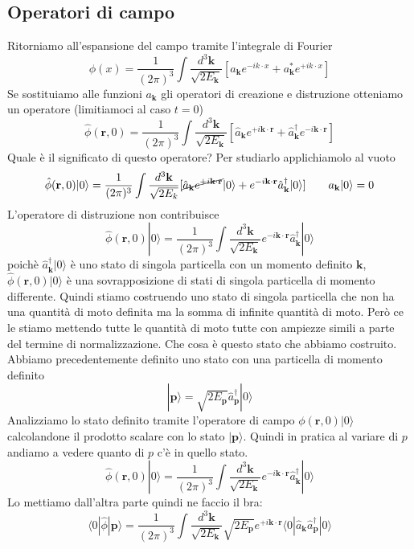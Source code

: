 \subsection{Operatori di campo}
Ritorniamo all'espansione del campo tramite l'integrale di Fourier
$$
\phi(x) = \frac{1}{(2\pi)^3} \int \frac{d^3\mathbf{k}}{\sqrt{2E_\mathbf{k}}} [a_\mathbf{k} e^{-ik\cdot x} + a_\mathbf{k}^* e^{+ik\cdot x}]
$$
Se sostituiamo alle funzioni $a_\mathbf{k}$ gli operatori di creazione e distruzione otteniamo un operatore (limitiamoci al caso $t=0$)
$$
\hat{\phi}(\mathbf{r}, 0) = \frac{1}{(2\pi)^3} \int \frac{d^3\mathbf{k}}{\sqrt{2E_\mathbf{k}}} [\hat{a}_\mathbf{k} e^{+i\mathbf{k}\cdot\mathbf{r}} + \hat{a}_\mathbf{k}^\dagger e^{-i\mathbf{k}\cdot\mathbf{r}}]
$$
Quale è il significato di questo operatore? Per studiarlo applichiamolo al vuoto
$$
\hat{\phi}(\mathbf{r}, 0)|0\rangle = \frac{1}{(2\pi)^3} \int \frac{d^3\mathbf{k}}{\sqrt{2E_k}} [\cancel{\hat{a}_\mathbf{k} e^{+i\mathbf{k}\cdot\mathbf{r}}} |0\rangle + e^{-i\mathbf{k}\cdot\mathbf{r}} \hat{a}_\mathbf{k}^\dagger |0\rangle] \qquad a_{\mathbf{k}}|0\rangle=0
$$
L'operatore di distruzione non contribuisce
$$
\hat{\phi}(\mathbf{r}, 0)|0\rangle = \frac{1}{(2\pi)^3} \int \frac{d^3\mathbf{k}}{\sqrt{2E_\mathbf{k}}} e^{-i\mathbf{k}\cdot\mathbf{r}} \hat{a}_\mathbf{k}^\dagger |0\rangle
$$
poichè $\hat{a}_\mathbf{k}^\dagger |0\rangle$ è uno stato di singola particella con un momento definito $\mathbf{k}$, $\hat{\phi}(\mathbf{r}, 0)|0\rangle$ è una sovrapposizione di stati di singola particella di momento differente. Quindi stiamo costruendo uno stato di singola particella che non ha una quantità di moto definita ma la somma di infinite quantità di moto. Però ce le stiamo mettendo tutte le quantità di moto tutte con ampiezze simili a parte del termine di normalizzazione. Che cosa è questo stato che abbiamo costruito. Abbiamo precedentemente definito uno stato con una particella di momento definito
$$
|\mathbf{p}\rangle = \sqrt{2E_\mathbf{p}} \hat{a}_\mathbf{p}^\dagger |0\rangle
$$
Analizziamo lo stato definito tramite l'operatore di campo $\phi(\mathbf{r},0)|0\rangle$ calcolandone il prodotto scalare con lo stato $|\mathbf{p}\rangle$. Quindi in pratica al variare di $p$ andiamo a vedere quanto di $p$ c'è in quello stato. 
$$
\hat{\phi}(\mathbf{r}, 0)|0\rangle = \frac{1}{(2\pi)^3} \int \frac{d^3\mathbf{k}}{\sqrt{2E_\mathbf{k}}} e^{-i\mathbf{k}\cdot\mathbf{r}} \hat{a}_\mathbf{k}^\dagger |0\rangle
$$
Lo mettiamo dall'altra parte quindi ne faccio il bra:
$$
\langle 0 | \hat{\phi} | \mathbf{p} \rangle = \frac{1}{(2\pi)^3} \int \frac{d^3\mathbf{k}}{\sqrt{2E_\mathbf{k}}} \sqrt{2E_\mathbf{p}} e^{+i\mathbf{k}\cdot\mathbf{r}} \langle 0 | \hat{a}_\mathbf{k} \hat{a}_\mathbf{p}^\dagger | 0 \rangle
$$
